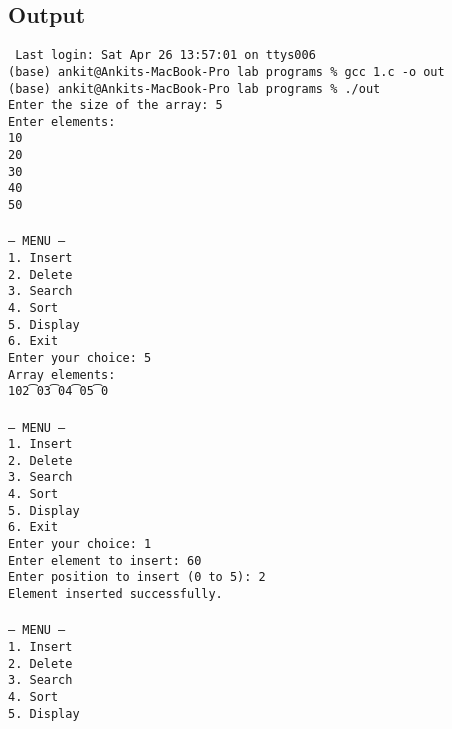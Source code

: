 \documentclass[12pt,a4paper]{article}
\begin{document}
\newpage

\subsection*{Output}
\begin{tcolorbox}[terminalstyle, title=Sample Output]
\texttt{
Last login: Sat Apr 26 13:57:01 on ttys006\\
(base) ankit@Ankits-MacBook-Pro lab programs \% gcc 1.c -o out\\
(base) ankit@Ankits-MacBook-Pro lab programs \% ./out\\
Enter the size of the array: 5\\
Enter elements:\\
10\\
20\\
30\\
40\\
50\\
\\
--- MENU ---\\
1. Insert\\
2. Delete\\
3. Search\\
4. Sort\\
5. Display\\
6. Exit\\
Enter your choice: 5\\
Array elements:\\
10\t20\t30\t40\t50\\
\\
--- MENU ---\\
1. Insert\\
2. Delete\\
3. Search\\
4. Sort\\
5. Display\\
6. Exit\\
Enter your choice: 1\\
Enter element to insert: 60\\
Enter position to insert (0 to 5): 2\\
Element inserted successfully.\\
\\
--- MENU ---\\
1. Insert\\
2. Delete\\
3. Search\\
4. Sort\\
5. Display\\
}
\end{tcolorbox}
\end{document}
